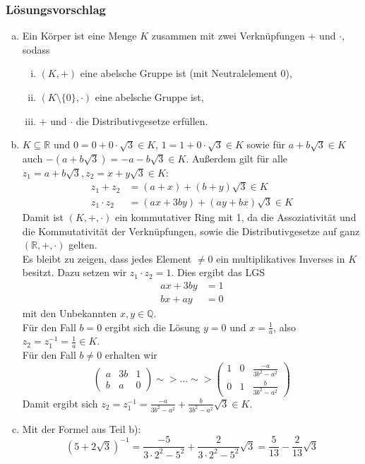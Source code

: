 \documentclass[a4paper,11pt]{scrartcl}
\newcounter{auf}
\newcommand{\RR}{\mathbb{R}}
\newcommand{\Q}{\mathbb{Q}}
\begin{document}
\subsubsection*{Lösungsvorschlag}
\begin{enumerate}[a)]

\item Ein Körper ist eine Menge $K$ zusammen mit zwei Verknüpfungen $+$ und $\cdot$, sodass
\begin{enumerate}[i)]
\item $(K,+)$ eine abelsche Gruppe ist (mit Neutralelement $0$),
\item $(K\setminus\{0\},\cdot)$ eine abelsche Gruppe ist,
\item $+$ und $\cdot$ die Distributivgesetze erfüllen.
\end{enumerate}

\item $K \subseteq \RR$ und $0=0+0 \cdot \sqrt{3} \in K$, $1=1+0 \cdot \sqrt{3} \in K$ sowie für $a+b \sqrt{3} \in K$ auch $-(a+b \sqrt{3})=-a-b\sqrt{3} \in K$. Außerdem gilt für alle $z_1=a+b\sqrt{3}, z_2=x+y\sqrt{3} \in K$:
\begin{align*}
z_1+z_2&=(a+x)+(b+y)\sqrt{3}\in K\\
z_1\cdot z_2&=(ax+3by)+(ay+bx)\sqrt{3} \in K
\end{align*}
Damit ist $(K,+,\cdot)$ ein kommutativer Ring mit 1, da die Assoziativität und die Kommutativität der Verknüpfungen, sowie die Distributivgesetze auf ganz $(\RR,+,\cdot)$ gelten.\\
Es bleibt zu zeigen, dass jedes Element $\ne 0$ ein multiplikatives Inverses in $K$ besitzt. Dazu setzen wir $z_1\cdot z_2=1$. Dies ergibt das LGS
\begin{align*}
ax+3by&=1\\
bx+ay&=0
\end{align*}
mit den Unbekannten $x, y \in \Q$.\\
Für den Fall $b=0$ ergibt sich die Lösung $y=0$ und $x=\frac{1}{a}$, also $z_2=z_1^{-1}=\frac{1}{a} \in K$.\\
Für den Fall $b\ne 0$ erhalten wir
$$
\left( \begin{array}{cc|c} a& 3b&1\\b&a&0 \end{array}\right) \sim> ... \sim> \left( \begin{array}{cc|c}1&0&\frac{-a}{3b^2-a^2}\\  0&1&\frac{b}{3b^2-a^2}\end{array}\right) 
$$
Damit ergibt sich $z_2=z_1^{-1}=\frac{-a}{3b^2-a^2}+\frac{b}{3b^2-a^2}\sqrt{3} \in K$.
\item Mit der Formel aus Teil b):
$$
(5+2\sqrt{3})^{-1}=\frac{-5}{3\cdot 2^2 - 5^2}+\frac{2}{3\cdot 2^2 - 5^2}\sqrt{3}=\frac{5}{13}-\frac{2}{13}\sqrt{3}
$$

\end{enumerate}
\end{document}
